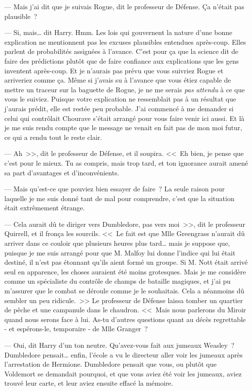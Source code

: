 --- Mais j'ai dit que je suivais Rogue, dit le professeur de Défense. Ça n'était pas plausible~?

--- Si, mais… dit Harry. Hmm. Les lois qui gouvernent la nature d'une bonne explication ne mentionnent pas les excuses plausibles entendues après-coup. Elles parlent de probabilités assignées à l'avance. C'est pour ça que la science dit de faire des prédictions plutôt que de faire confiance aux explications que les gens inventent après-coup. Et je n'aurais pas prévu que vous suivriez Rogue et arriveriez comme ça. Même si j'avais su à l'avance que vous étiez capable de mettre un traceur sur la baguette de Rogue, je ne me serais \emph{pas attendu} à ce que vous le suiviez. Puisque votre explication ne ressemblait pas à un résultat que j'aurais prédit, elle est restée peu probable. J'ai commencé à me demander si celui qui contrôlait Chourave s'était arrangé pour vous faire venir ici aussi. Et là je me suis rendu compte que le message ne venait en fait pas de mon moi futur, ce qui a rendu tout le reste clair.

--- Ah~>>, dit le professeur de Défense, et il soupira. <<~Eh bien, je pense que c'est pour le mieux. Tu as compris, mais trop tard, et ton ignorance aurait amené sa part d'avantages et d'inconvénients.

--- Mais qu'est-ce que pouviez bien essayer de faire~? La seule raison pour laquelle je me suis donné tant de mal pour comprendre, c'est que la situation était extrêmement étrange.

--- Cela aurait dû te diriger vers Dumbledore, pas vers moi~>>, dit le professeur Quirrell, et il fronça les sourcils. <<~Le fait est que Mlle Greengrass n'aurait dû arriver dans ce couloir que plusieurs heures plus tard… mais je suppose que, puisque je me suis arrangé pour que M. Malfoy lui donne l'indice qui lui était destiné, il n'est pas étonnant qu'ils aient formé un groupe. Si M. Nott était arrivé seul en apparence, les choses auraient été moins grotesques. Mais je me considère comme un spécialiste du contrôle de champs de bataille magiques, et j'ai pu m'assurer que le combat se déroule comme je le souhaitais. Cela a néanmoins dû sembler un peu ridicule.~>> Le professeur de Défense laissa tomber un quartier de pêche et une campanule dans le chaudron. <<~Mais nous parlerons du Miroir quand nous serons face à lui. As-tu d'autres questions quant au décès regrettable - et espérons-le, temporaire - de Mlle Granger~?

--- Oui, dit Harry d'un ton neutre. Qu'avez-vous fait aux jumeaux Weasley~? Dumbledore pensait… enfin, l'école a vu le directeur aller voir les jumeaux après l'arrestation de Hermione. Dumbledore pensait que vous, ou plutôt que Voldemort se demandait pourquoi, et que vous aviez été voir les jumeaux, aviez trouvé leur carte, et leur aviez ensuite effacé la mémoire.

